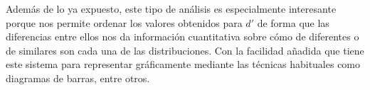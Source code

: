 \documentclass[11pt,a4paper]{book}
\begin{document}
            Además de lo ya expuesto, este tipo de análisis es especialmente interesante porque nos permite ordenar los valores obtenidos para $d'$ de forma que las diferencias entre ellos nos da información cuantitativa sobre cómo de diferentes o de similares son cada una de las distribuciones. Con la facilidad añadida que tiene este sistema para representar gráficamente mediante las técnicas habituales como diagramas de barras, entre otros.
    
    
    
    
\end{document}
